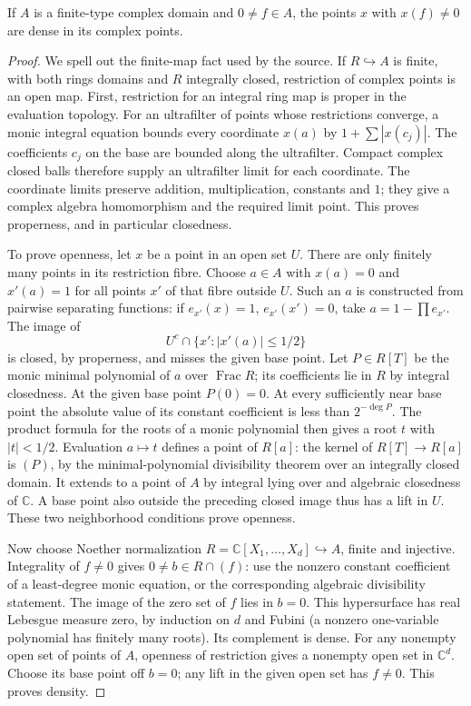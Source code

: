 \begin{srlemma}
\label{lem:ftb-complex-principal-open-dense}
If \(A\) is a finite-type complex domain and \(0\ne f\in A\),
the points \(x\) with \(x(f)\ne0\) are dense in its complex points.
\end{srlemma}
\begin{proof}
We spell out the finite-map fact used by the source.
If \(R\hookrightarrow A\) is finite, with both rings domains
and \(R\) integrally closed, restriction of complex points is
an open map.
First, restriction for an integral ring map is proper in
the evaluation topology.
For an ultrafilter of points whose restrictions converge,
a monic integral equation bounds every coordinate \(x(a)\)
by \(1+\sum|x(c_j)|\).
The coefficients \(c_j\) on the base are bounded along
the ultrafilter.
Compact complex closed balls therefore supply an
ultrafilter limit for each coordinate.
The coordinate limits preserve addition, multiplication,
constants and \(1\); they give a complex algebra homomorphism
and the required limit point.
This proves properness, and in particular closedness.

To prove openness, let \(x\) be a point in an open set \(U\).
There are only finitely many points in its restriction fibre.
Choose \(a\in A\) with \(x(a)=0\) and \(x'(a)=1\) for
all points \(x'\) of that fibre outside \(U\).
Such an \(a\) is constructed from pairwise separating
functions: if \(e_{x'}(x)=1\), \(e_{x'}(x')=0\), take
\(a=1-\prod e_{x'}\).
The image of
\[
                        U^c\cap\{x':|x'(a)|\le1/2\}
\]
is closed, by properness, and misses the given base point.
Let \(P\in R[T]\) be the monic minimal polynomial of \(a\)
over \(\operatorname{Frac}R\); its coefficients lie in \(R\)
by integral closedness.
At the given base point \(P(0)=0\).
At every sufficiently near base point the absolute value
of its constant coefficient is less than \(2^{-\deg P}\).
The product formula for the roots of a monic polynomial
then gives a root \(t\) with \(|t|<1/2\).
Evaluation \(a\mapsto t\) defines a point of \(R[a]\):
the kernel of \(R[T]\to R[a]\) is \((P)\), by the
minimal-polynomial divisibility theorem over an integrally
closed domain.
It extends to a point of \(A\) by integral lying over and
algebraic closedness of \(\mathbb C\).
A base point also outside the preceding closed image thus
has a lift in \(U\).
These two neighborhood conditions prove openness.

Now choose Noether normalization
\(R=\mathbb C[X_1,\ldots,X_d]\hookrightarrow A\), finite and
injective.
Integrality of \(f\ne0\) gives \(0\ne b\in R\cap(f)\):
use the nonzero constant coefficient of a least-degree
monic equation, or the corresponding algebraic divisibility
statement.
The image of the zero set of \(f\) lies in \(b=0\).
This hypersurface has real Lebesgue measure zero, by induction
on \(d\) and Fubini (a nonzero one-variable polynomial has
finitely many roots).
Its complement is dense.
For any nonempty open set of points of \(A\), openness of
restriction gives a nonempty open set in \(\mathbb C^d\).
Choose its base point off \(b=0\); any lift in the given
open set has \(f\ne0\).
This proves density.
\end{proof}

